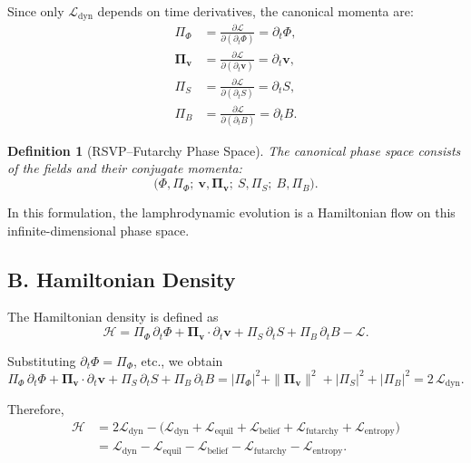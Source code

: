 \documentclass[12pt]{article}
\newtheorem{definition}{Definition}
\begin{document}
Since only $\mathcal{L}_{\text{dyn}}$ depends on time derivatives, the
canonical momenta are:
\begin{align}
\Pi_\Phi &= \frac{\partial \mathcal{L}}{\partial(\partial_t \Phi)}
        = \partial_t \Phi, \\[4pt]
\bm{\Pi}_{\mathbf{v}} &= 
\frac{\partial \mathcal{L}}{\partial(\partial_t \mathbf{v})}
        = \partial_t \mathbf{v}, \\[4pt]
\Pi_S &= \frac{\partial \mathcal{L}}{\partial(\partial_t S)}
        = \partial_t S, \\[4pt]
\Pi_B &= \frac{\partial \mathcal{L}}{\partial(\partial_t B)}
        = \partial_t B.
\end{align}

\begin{definition}[RSVP--Futarchy Phase Space]
The canonical phase space consists of the fields and their conjugate
momenta:
\[
\big( \Phi, \Pi_\Phi;\ 
      \mathbf{v}, \bm{\Pi}_{\mathbf{v}};\ 
      S, \Pi_S;\ 
      B, \Pi_B
\big).
\]
\end{definition}

In this formulation, the lamphrodynamic evolution is a Hamiltonian flow
on this infinite-dimensional phase space.

\subsection*{B. Hamiltonian Density}

The Hamiltonian density is defined as
\[
\mathcal{H}
= 
\Pi_\Phi\, \partial_t \Phi
+
\bm{\Pi}_{\mathbf{v}}\!\cdot \partial_t \mathbf{v}
+
\Pi_S\, \partial_t S
+
\Pi_B\, \partial_t B
-
\mathcal{L}.
\]

Substituting $\partial_t \Phi = \Pi_\Phi$, etc., we obtain
\begin{equation}
\Pi_\Phi\, \partial_t \Phi
+
\bm{\Pi}_{\mathbf{v}}\!\cdot \partial_t \mathbf{v}
+
\Pi_S\, \partial_t S
+
\Pi_B\, \partial_t B
=
|\Pi_\Phi|^2
+
\|\bm{\Pi}_{\mathbf{v}}\|^2
+
|\Pi_S|^2
+
|\Pi_B|^2
= 2\, \mathcal{L}_{\text{dyn}}.
\end{equation}

Therefore,
\begin{align}
\mathcal{H}
&=
2\mathcal{L}_{\text{dyn}} 
-
\big(
\mathcal{L}_{\text{dyn}}
+
\mathcal{L}_{\text{equil}}
+
\mathcal{L}_{\text{belief}}
+
\mathcal{L}_{\text{futarchy}}
+
\mathcal{L}_{\text{entropy}}
\big) \\[4pt]
&=
\mathcal{L}_{\text{dyn}}
-
\mathcal{L}_{\text{equil}}
-
\mathcal{L}_{\text{belief}}
-
\mathcal{L}_{\text{futarchy}}
-
\mathcal{L}_{\text{entropy}}.
\end{align}
\end{document}

